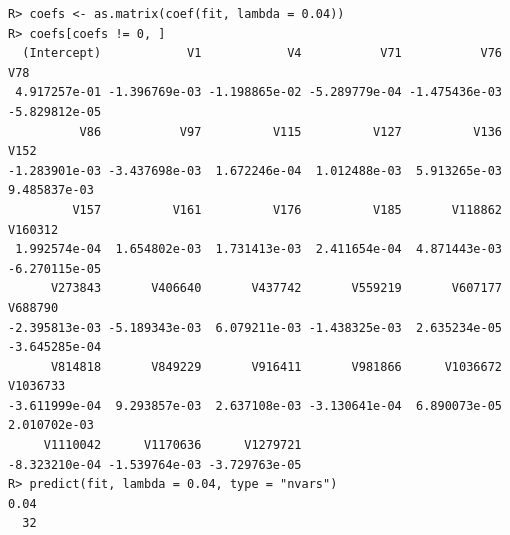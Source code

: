 \begin{verbatim}
R> coefs <- as.matrix(coef(fit, lambda = 0.04))
R> coefs[coefs != 0, ]
  (Intercept)            V1            V4           V71           V76           V78 
 4.917257e-01 -1.396769e-03 -1.198865e-02 -5.289779e-04 -1.475436e-03 -5.829812e-05 
          V86           V97          V115          V127          V136          V152 
-1.283901e-03 -3.437698e-03  1.672246e-04  1.012488e-03  5.913265e-03  9.485837e-03 
         V157          V161          V176          V185       V118862       V160312 
 1.992574e-04  1.654802e-03  1.731413e-03  2.411654e-04  4.871443e-03 -6.270115e-05 
      V273843       V406640       V437742       V559219       V607177       V688790 
-2.395813e-03 -5.189343e-03  6.079211e-03 -1.438325e-03  2.635234e-05 -3.645285e-04 
      V814818       V849229       V916411       V981866      V1036672      V1036733 
-3.611999e-04  9.293857e-03  2.637108e-03 -3.130641e-04  6.890073e-05  2.010702e-03 
     V1110042      V1170636      V1279721 
-8.323210e-04 -1.539764e-03 -3.729763e-05 
R> predict(fit, lambda = 0.04, type = "nvars")
0.04 
  32 
\end{verbatim}


